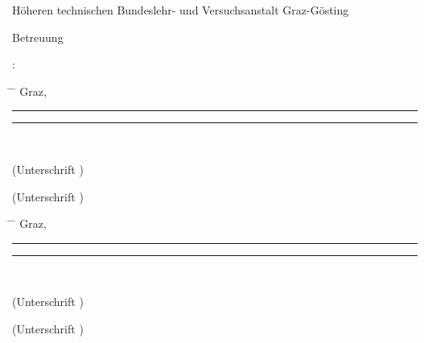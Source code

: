 \begin{center}
\begin{minipage}[t][1.7cm][t]{\textwidth}
  H\"{o}heren technischen Bundeslehr- und Versuchsanstalt Graz-Gösting
\end{minipage}

\begin{minipage}[t][2cm][t]{\textwidth}%
  \vspace{0pt}\sffamily\thesistitlefontnormalsize\raggedright
  Betreuung

  \tuinfthesisbetreuung: \tuinfthesisbetreins
\end{minipage}

\begin{minipage}[t][2cm][t]{\textwidth}%
  \vspace{0pt}\sffamily\thesistitlefontnormalsize
  \begin{tabbing}%
    \hspace{44mm} \= \hspace{66mm} \= \hspace{51mm} \kill
    Graz, \tuinfthesisdate \> {\raggedright\rule{51mm}{0.5pt}} \> {\raggedright\rule{51mm}{0.5pt}} \\
    \> \begin{minipage}[t][0.5cm][t]{51mm}\centering (Unterschrift \tuinfthesisverfassung)\end{minipage}
    \> \begin{minipage}[t][0.5cm][t]{51mm}\centering (Unterschrift \tuinfthesisbetreuung)\end{minipage}
    \end{tabbing}
\end{minipage}


\begin{minipage}[t][2cm][t]{\textwidth}%
  \vspace{0pt}\sffamily\thesistitlefontnormalsize
  \begin{tabbing}%
    \hspace{44mm} \= \hspace{66mm} \= \hspace{51mm} \kill
    Graz, \tuinfthesisdate \> {\raggedright\rule{51mm}{0.5pt}} \> {\raggedright\rule{51mm}{0.5pt}} \\
    \> \begin{minipage}[t][0.5cm][t]{51mm}\centering (Unterschrift \tuinfthesisverfassung)\end{minipage}
    \> \begin{minipage}[t][0.5cm][t]{51mm}\centering (Unterschrift \tuinfthesisbetreuung)\end{minipage}
    \end{tabbing}
\end{minipage}



\end{center}

